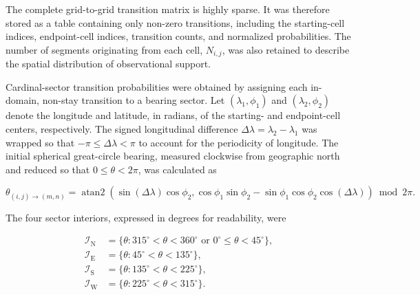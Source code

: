 \documentclass[
  draft
]{agujournal2025}
\begin{document}
            The complete grid-to-grid transition matrix is highly sparse. It was therefore stored as a table containing only non-zero transitions, including the starting-cell indices, endpoint-cell indices, transition counts, and normalized probabilities. The number of segments originating from each cell, $N_{i,j}$, was also retained to describe the spatial distribution of observational support.
            
            Cardinal-sector transition probabilities were obtained by assigning each in-domain, non-stay transition to a bearing sector. Let $(\lambda_1,\phi_1)$ and $(\lambda_2,\phi_2)$ denote the longitude and latitude, in radians, of the starting- and endpoint-cell centers, respectively. The signed longitudinal difference $\Delta\lambda=\lambda_2-\lambda_1$ was wrapped so that $-\pi\leq\Delta\lambda<\pi$ to account for the periodicity of longitude. The initial spherical great-circle bearing, measured clockwise from geographic north and reduced so that $0\leq\theta<2\pi$, was calculated as

            \begin{equation}
                \theta_{(i,j)\rightarrow(m,n)} =
                \operatorname{atan2}\!\left(
                    \sin(\Delta\lambda)\cos\phi_2,
                    \cos\phi_1\sin\phi_2
                    - \sin\phi_1\cos\phi_2\cos(\Delta\lambda)
                \right)
                \bmod 2\pi.
                \label{eq:gridded_transition_bearing}
            \end{equation}

            The four sector interiors, expressed in degrees for readability, were

            \begin{equation}
                \begin{aligned}
                    \mathcal{I}_{\mathrm{N}} &=
                        \{\theta:315^{\circ}<\theta<360^{\circ}
                        \text{ or }0^{\circ}\leq\theta<45^{\circ}\}, \\
                    \mathcal{I}_{\mathrm{E}} &=
                        \{\theta:45^{\circ}<\theta<135^{\circ}\}, \\
                    \mathcal{I}_{\mathrm{S}} &=
                        \{\theta:135^{\circ}<\theta<225^{\circ}\}, \\
                    \mathcal{I}_{\mathrm{W}} &=
                        \{\theta:225^{\circ}<\theta<315^{\circ}\}.
                \end{aligned}
                \label{eq:gridded_cardinal_sector_interiors}
            \end{equation}
\end{document}
